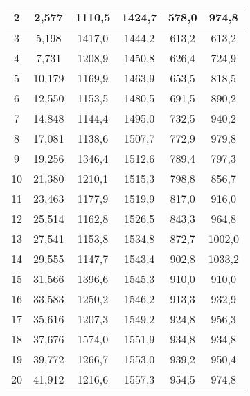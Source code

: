\begin{enumerate}
\begin{longtable}{|c|c|c|c|c|c|}
			2 & 
			2,577 & 
			1110,5 & 
			1424,7 &
			578,0 & 
			974,8  
			\\\hline
		
			3 & 
			5,198 & 
			1417,0 & 
			1444,2 &
			613,2 & 
			613,2  
			\\\hline
		
			4 & 
			7,731 & 
			1208,9 & 
			1450,8 &
			626,4 & 
			724,9  
			\\\hline
		
			5 & 
			10,179 & 
			1169,9 & 
			1463,9 &
			653,5 & 
			818,5  
			\\\hline
		
			6 & 
			12,550 & 
			1153,5 & 
			1480,5 &
			691,5 & 
			890,2  
			\\\hline
		
			7 & 
			14,848 & 
			1144,4 & 
			1495,0 &
			732,5 & 
			940,2  
			\\\hline
		
			8 & 
			17,081 & 
			1138,6 & 
			1507,7 &
			772,9 & 
			979,8  
			\\\hline
		
			9 & 
			19,256 & 
			1346,4 & 
			1512,6 &
			789,4 & 
			797,3  
			\\\hline
		
			10 & 
			21,380 & 
			1210,1 & 
			1515,3 &
			798,8 & 
			856,7  
			\\\hline
		
			11 & 
			23,463 & 
			1177,9 & 
			1519,9 &
			817,0 & 
			916,0  
			\\\hline
		
			12 & 
			25,514 & 
			1162,8 & 
			1526,5 &
			843,3 & 
			964,8  
			\\\hline
		
			13 & 
			27,541 & 
			1153,8 & 
			1534,8 &
			872,7 & 
			1002,0  
			\\\hline
		
			14 & 
			29,555 & 
			1147,7 & 
			1543,4 &
			902,8 & 
			1033,2  
			\\\hline
		
			15 & 
			31,566 & 
			1396,6 & 
			1545,3 &
			910,0 & 
			910,0  
			\\\hline
		
			16 & 
			33,583 & 
			1250,2 & 
			1546,2 &
			913,3 & 
			932,9  
			\\\hline
		
			17 & 
			35,616 & 
			1207,3 & 
			1549,2 &
			924,8 & 
			956,3  
			\\\hline
		
			18 & 
			37,676 & 
			1574,0 & 
			1551,9 &
			934,8 & 
			934,8  
			\\\hline
		
			19 & 
			39,772 & 
			1266,7 & 
			1553,0 &
			939,2 & 
			950,4  
			\\\hline
		
			20 & 
			41,912 & 
			1216,6 & 
			1557,3 &
			954,5 & 
			974,8  
			\\\hline
			
		\end{longtable}

\end{enumerate}

